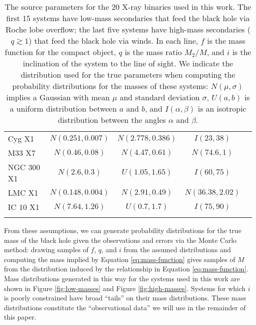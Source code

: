 \documentclass[preprint]{aastex}
\begin{document}
\begin{table}
\begin{center}
\begin{tabular}{|l|c|c|c|l|}
      Cyg X1 & $N(0.251, 0.007)$ & $N(2.778, 0.386)$ & $I(23, 38)$ &
      \citet{Gies2003} \\ 
      M33 X7 & $N(0.46, 0.08)$ & $N(4.47, 0.61)$ & $N(74.6, 1)$ &
      \citet{Orosz2007} \\
      NGC 300 X1 & $N(2.6, 0.3)$ & $U(1.05, 1.65)$ & $I(60, 75)$ &
      \citet{Crowther2010} \\
      LMC X1 & $N(0.148, 0.004)$ & $N(2.91, 0.49)$ & $N(36.38, 2.02)$
      & \citet{Orosz2009} \\
      IC 10 X1 & $N(7.64, 1.26)$ & $U(0.7, 1.7)$ & $I(75, 90)$ & 
      \citet{Prestwich2007} \\
       & & & & \citet{Silverman2008} \\
       \hline
    \end{tabular}
  \end{center}
  \caption{\label{tab:sources} The source parameters for the 20 X-ray binaries used in this work.  The first 15 systems have
    low-mass secondaries that feed the black hole via Roche lobe
    overflow; the last five systems have high-mass secondaries ($q
    \gtrsim 1$) that feed the black hole via winds.  In each line, $f$
    is the mass function for
    the compact object, $q$ is the mass ratio $M_2/M$, and $i$ is the
    inclination of the system to the line of sight.  We indicate the
    distribution used for the true parameters when computing the
    probability distributions for the masses of these systems:
    $N(\mu,\sigma)$ implies a Gaussian with mean $\mu$ and standard
    deviation $\sigma$, $U(a,b)$ is a uniform distribution between $a$ and
    $b$, and $I(\alpha,\beta)$ is an isotropic distribution between the
    angles $\alpha$ and $\beta$.}
\end{table}

From these assumptions, we can generate probability distributions for
the true mass of the black hole given the observations and errors via
the Monte Carlo method: drawing samples of $f$, $q$, and $i$ from the
assumed distributions and computing the mass implied by Equation
\eqref{eq:mass-function} gives samples of $M$ from the distribution
induced by the relationship in Equation \eqref{eq:mass-function}.
Mass distributions generated in this way for the systems used in this
work are shown in Figure \ref{fig:low-masses} and Figure
\ref{fig:high-masses}.  Systems for which $i$ is poorly constrained
have broad ``tails'' on their mass distributions.  These mass
distributions constitute the ``observational data'' we will use in the
remainder of this paper.
\end{document}
